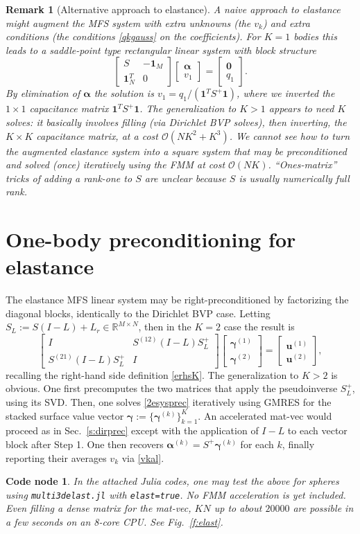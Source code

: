 \documentclass[10pt]{article}
\newcommand{\be}{\begin{equation}}
\newcommand{\ee}{\end{equation}}
\newcommand{\mbf}[1]{{\mathbf #1}}
\newcommand{\R}{\mathbb{R}}
\newcommand{\vt}[2]{\left[\begin{array}{r}#1\\#2\end{array}\right]} %
\newcommand{\mt}[4]{\left[\begin{array}{ll}#1&#2\\#3&#4\end{array}\right]} %
\newcommand{\bigO}{{\mathcal O}}
\newtheorem{rmk}[thm]{Remark}
\newtheorem{cno}[thm]{Code node}
\newcommand{\bal}{\bm{\alpha}}
\newcommand{\bga}{\bm{\gamma}}
\newcommand{\ok}{^{(k)}}
\begin{document}
\begin{rmk}[Alternative approach to elastance]\label{r:saddle}
A naive approach to elastance might augment the MFS system
with extra unknowns (the $v_k$) and extra conditions
(the conditions \eqref{qkgauss} on the coefficients).
For $K=1$ bodies this leads to a saddle-point type
rectangular linear system
with block structure
$$
\mt{S}{-\mbf{1}_M}{\mbf{1}_N^T}{0} \vt{\bal}{v_1} = \vt{\mbf{0}}{q_1}.
$$
By elimination of $\bal$ the solution is $v_1 = q_1 / (\mbf{1}^T S^+ \mbf{1})$,
where we inverted the $1\times 1$ capacitance matrix $\mbf{1}^T S^+ \mbf{1}$.
The generalization to $K>1$ appears to need $K$ solves:
it basically involves filling (via Dirichlet BVP solves), then inverting, the $K\times K$ capacitance matrix, at a cost $\bigO(NK^2 + K^3)$.
We cannot see how to turn the augmented elastance system into a square system that
may be preconditioned and solved (once) iteratively using the FMM
at cost $\bigO(NK)$.
``Ones-matrix'' tricks of adding a rank-one to $S$ are unclear
because $S$ is usually numerically full rank.
\end{rmk}


\section{One-body preconditioning for elastance}

The elastance MFS linear system may be right-preconditioned by factorizing
the diagonal blocks, identically to the Dirichlet BVP case.
Letting $S_L := S(I-L) + L_r \in \R^{M\times N}$,
then in the $K=2$ case the result is
\be
\mt{I}{S^{(12)}(I-L)S_L^+}{S^{(21)}(I-L)S_L^+}{I} \vt{\bga^{(1)}}{\bga^{(2)}} = \vt{\mbf{u}^{(1)}}{\mbf{u}^{(2)}},
\label{2esysprec}
\ee
recalling the right-hand side definition \eqref{erhsK}.
The generalization to $K>2$ is obvious.
One first precomputes the two matrices that apply the pseudoinverse
$S^+_L$, using its SVD.
Then, one solves \eqref{2esysprec}
iteratively using GMRES for the stacked surface
value vector
$\bga := \{\bga\ok\}_{k=1}^K$.
An accelerated mat-vec would proceed as in Sec.~\ref{s:dirprec} except
with the application of $I-L$ to each vector block after Step 1.
One then recovers $\bal\ok = S^+ \bga\ok$ for each $k$,
finally reporting their averages $v_k$ via \eqref{vkal}.

\begin{cno}
  In the attached Julia codes, one may test the above for spheres using
{\tt multi3delast.jl} with {\tt elast=true}.
No FMM acceleration is yet included. Even filling a dense matrix
for the mat-vec, $KN$ up to about $20000$ are
possible in a few seconds on an 8-core CPU. See Fig.~\ref{f:elast}.
  \end{cno}
\end{document}
